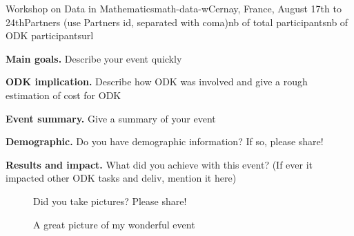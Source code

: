 \begin{event}{Workshop on Data in Mathematics}{math-data-w}{Cernay, France, August 17th to 24th}{Partners (use Partners id, separated with coma)}{nb of total participants}{nb of ODK participants}{url}

\textbf{Main goals.} Describe your event quickly

\textbf{ODK implication.} Describe how ODK was involved and give a rough estimation of cost for ODK

\textbf{Event summary.} Give a summary of your event

\textbf{Demographic.} Do you have demographic information? If so, please share!

\textbf{Results and impact.} What did you achieve with this event? (If ever it impacted 
other ODK tasks and deliv, mention it here)

\begin{figure}[ht]
\caption*{A great picture of my wonderful event}
Did you take pictures? Please share!
\end{figure}



\end{event}
